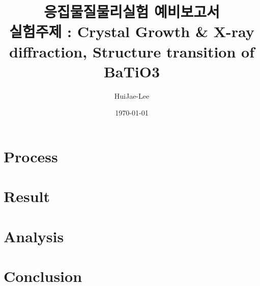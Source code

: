\documentclass[aps,reprint,superscriptaddress,11pt]{revtex4-2}
\begin{document}
\title{응집물질물리실험 예비보고서 \\
\small 실험주제 : Crystal Growth \& X-ray diffraction,
Structure transition of BaTiO3}

\author{HuiJae-Lee}

\date{\today}

\begin{abstract}

\end{abstract}

\maketitle



\section{Process}



\section{Result}


\section{Analysis}







\section{Conclusion}


\nocite{*}





\vfill
\end{document}
